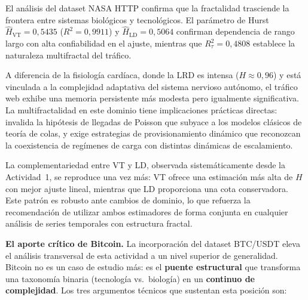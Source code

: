 El análisis del dataset NASA HTTP confirma que la fractalidad trasciende la
frontera entre sistemas biológicos y tecnológicos. El parámetro de Hurst
$\hat{H}_{\text{VT}} = 0{,}5435$ ($R^2 = 0{,}9911$) y
$\hat{H}_{\text{LD}} = 0{,}5064$ confirman dependencia de rango largo con
alta confiabilidad en el ajuste, mientras que $R^2_{\tau} = 0{,}4808$
establece la naturaleza multifractal del tráfico.

A diferencia de la fisiología cardíaca, donde la LRD es intensa
($H\approx0{,}96$) y está vinculada a la complejidad adaptativa del sistema
nervioso autónomo, el tráfico web exhibe una memoria persistente más modesta
pero igualmente significativa. La multifractalidad en este dominio tiene
implicaciones prácticas directas: invalida la hipótesis de llegadas de Poisson
que subyace a los modelos clásicos de teoría de colas, y exige estrategias de
provisionamiento dinámico que reconozcan la coexistencia de regímenes de carga
con distintas dinámicas de escalamiento.

La complementariedad entre VT y LD, observada sistemáticamente desde la
Actividad~1, se reproduce una vez más: VT ofrece una estimación más alta de $H$
con mejor ajuste lineal, mientras que LD proporciona una cota conservadora. Este
patrón es robusto ante cambios de dominio, lo que refuerza la recomendación de
utilizar ambos estimadores de forma conjunta en cualquier análisis de series
temporales con estructura fractal.

\textbf{El aporte crítico de Bitcoin.} La incorporación del dataset BTC/USDT
eleva el análisis transversal de esta actividad a un nivel superior de
generalidad. Bitcoin no es un caso de estudio más: es el \textbf{puente
estructural} que transforma una taxonomía binaria (tecnología vs.~biología) en
un \textbf{continuo de complejidad}. Los tres argumentos técnicos que sustentan
esta posición son:

